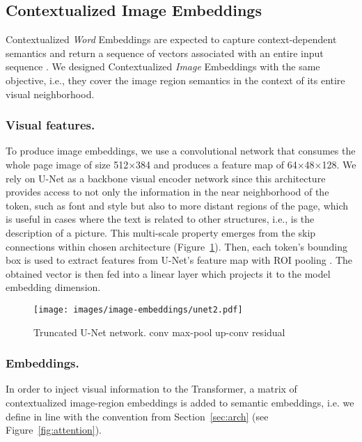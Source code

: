 \documentclass[runningheads]{llncs}
\begin{document}
\subsection{Contextualized Image Embeddings}\label{sec:image_context}

Contextualized \emph{Word} Embeddings are expected to capture context-dependent semantics and return a sequence of vectors associated with an entire input sequence \cite{Ethayarajh2019HowCA}. We designed Contextualized \emph{Image} Embeddings with the same objective, i.e., they cover the image region semantics in the context of its entire visual neighborhood.

\subsubsection{Visual features.}
To produce image embeddings, we use a convolutional network that consumes the whole page image of size 512×384 and produces a feature map of 64×48×128. We rely on U-Net as a backbone visual encoder network \cite{RFB15a} since this architecture provides access to not only the information in the near neighborhood of the token, such as font and style but also to more distant regions of the page, which is useful in cases where the text is related to other structures, i.e., is the description of a picture. This multi-scale property emerges from the skip connections within chosen architecture (Figure~\ref{fig:unet}). Then, each token's bounding box is used to extract features from U-Net's feature map with ROI pooling \cite{dai2016object}. The obtained vector is then fed into a linear layer which projects it to the model embedding dimension.

\begin{figure}
    \centering
    \texttt{[image: images/image-embeddings/unet2.pdf]}
    \caption{Truncated U-Net network.\quad {\color{applica}{\textbf{}}} conv \quad {\color{aorange}{\textbf{}}} max-pool \quad {\color{agreen}{\textbf{}}} up-conv \quad {\color{agray}{\textbf{}}} residual}
    \label{fig:unet}
\end{figure}

\subsubsection{Embeddings.} In order to inject visual information to the Transformer, a matrix of contextualized image-region embeddings  is added to semantic embeddings, i.e. we define  in line with the convention from Section~\ref{sec:arch} (see Figure~\ref{fig:attention}).
\end{document}
